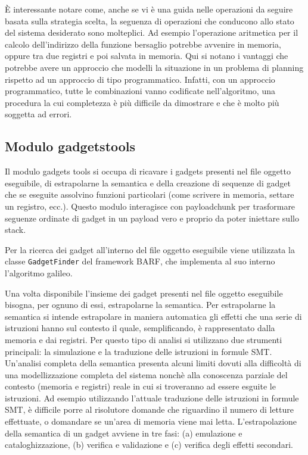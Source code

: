 È interessante notare come, anche se vi è una guida nelle operazioni
da seguire basata sulla strategia scelta, la seguenza di operazioni
che conducono allo stato del sistema desiderato sono molteplici. Ad
esempio l'operazione aritmetica per il calcolo dell'indirizzo della
funzione bersaglio potrebbe avvenire in memoria, oppure tra due
registri e poi salvata in memoria. Qui si notano i vantaggi che
potrebbe avere un approccio che modelli la situazione in un problema
di planning rispetto ad un approccio di tipo programmatico. Infatti,
con un approccio programmatico, tutte le combinazioni vanno codificate
nell'algoritmo, una procedura la cui completezza è più difficile da
dimostrare e che è molto più soggetta ad errori.

\subsection{Modulo gadgetstools}

Il modulo gadgets tools si occupa di ricavare i gadgets presenti nel
file oggetto eseguibile, di estrapolarne la semantica e della
creazione di sequenze di gadget che se eseguite assolvino funzioni
particolari (come scrivere in memoria, settare un registro,
ecc.). Questo modulo interagisce con payloadchunk per trasformare
seguenze ordinate di gadget in un payload vero e proprio da poter
iniettare sullo stack.

Per la ricerca dei gadget all'interno del file oggetto eseguibile
viene utilizzata la classe \lstinline{GadgetFinder} del framework
BARF, che implementa al suo interno l'algoritmo galileo\cite{roemer-12}. 


Una volta disponibile l'insieme dei gadget presenti nel file oggetto
eseguibile bisogna, per ognuno di essi, estrapolarne la semantica. Per
estrapolarne la semantica si intende estrapolare in maniera automatica
gli effetti che una serie di istruzioni hanno sul contesto il quale,
semplificando, è rappresentato dalla memoria e dai registri. Per
questo tipo di analisi si utilizzano due strumenti principali: la
simulazione e la traduzione delle istruzioni in formule
SMT. Un'analisi completa della semantica presenta alcuni limiti dovuti
alla difficoltà di una modellizzazione completa del sistema nonchè
alla conoscenza parziale del contesto (memoria e registri) reale in
cui si troveranno ad essere esguite le istruzioni. Ad esempio
utilizzando l'attuale traduzione delle istruzioni in formule SMT, è
difficile porre al risolutore domande che riguardino il numero di
letture effettuate, o domandare se un'area di memoria viene mai
letta. L'estrapolazione della semantica di un gadget avviene in tre
fasi: (a) emulazione e cataloghizzazione, (b) verifica e validazione e
(c) verifica degli effetti secondari.

